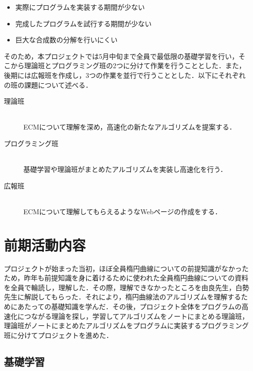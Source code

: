 \documentclass[openany,11pt,papersize]{jsbook}
\begin{document}
\begin{itemize}
\item 実際にプログラムを実装する期間が少ない
\item 完成したプログラムを試行する期間が少ない
\item 巨大な合成数の分解を行いにくい
\end{itemize}

そのため，本プロジェクトでは5月中旬まで全員で最低限の基礎学習を行い，そこから理論班とプログラミング班の2つに分けて作業を行うこととした．また，後期には広報班を作成し，3つの作業を並行で行うこととした．以下にそれぞれの班の課題について述べる．

\begin{description}
 \item[理論班]\mbox{}\\ 
	    ECMについて理解を深め，高速化の新たなアルゴリズムを提案する．
 \item[プログラミング班]\mbox{}\\
	    基礎学習や理論班がまとめたアルゴリズムを実装し高速化を行う．
 \item[広報班]\mbox{}\\
	    ECMについて理解してもらえるようなWebページの作成をする．
\end{description}

\chapter{前期活動内容}

プロジェクトが始まった当初，ほぼ全員楕円曲線についての前提知識がなかったため，昨年も前提知識を身に着けるために使われた全員楕円曲線についての資料を全員で輪読し，理解した．その際，理解できなかったところを由良先生，白勢先生に解説してもらった．それにより，楕円曲線法のアルゴリズムを理解するためにあたっての基礎知識を学んだ．その後，プロジェクト全体をプログラムの高速化につながる理論を探し，学習してアルゴリズムをノートにまとめる理論班，理論班がノートにまとめたアルゴリズムをプログラムに実装するプログラミング班に分けてプロジェクトを進めた．


\section{基礎学習}
\end{document}
